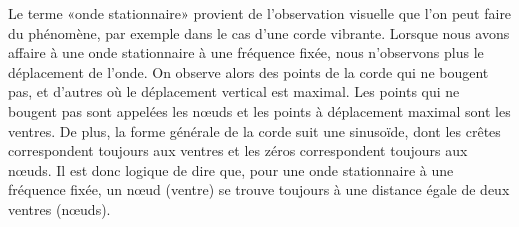 \par Le terme «onde stationnaire» provient de l'observation visuelle que l'on peut faire du phénomène, par exemple dans le cas d'une corde vibrante. Lorsque nous avons affaire à une onde stationnaire à une fréquence fixée, nous n'observons plus le déplacement de l'onde. On observe alors des points de la corde qui ne bougent pas, et d'autres où le déplacement vertical est maximal. Les points qui ne bougent pas sont appelées les nœuds et les points à déplacement maximal sont les ventres. De plus, la forme générale de la corde suit une sinusoïde, dont les crêtes correspondent toujours aux ventres et les zéros correspondent toujours aux nœuds. Il est donc logique de dire que, pour une onde stationnaire à une fréquence fixée, un nœud (ventre) se trouve toujours à une distance égale de deux ventres (nœuds).
